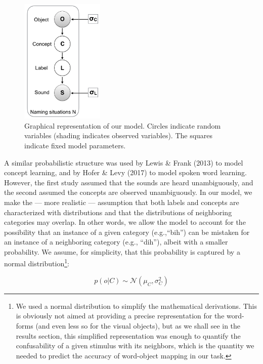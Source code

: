 \documentclass[english,,man]{apa6}
\let\rmarkdownfootnote\footnote%
\def\footnote{\protect\rmarkdownfootnote}
\begin{document}
\begin{figure}

{\centering \includegraphics[width=150px]{figs/model} 

}

\caption{Graphical representation of our model. Circles indicate random variables (shading indicates observed variables). The squares indicate fixed model parameters.}\label{fig:model}
\end{figure}

A similar probabilistic structure was used by Lewis \& Frank (2013) to model concept learning, and by Hofer \& Levy (2017) to model spoken word learning. However, the first study assumed that the sounds are heard unambiguously, and the second assumed the concepts are observed unambiguously. In our model, we make the --- more realistic --- assumption that both labels and concepts are characterized with distributions and that the distributions of neighboring categories may overlap. In other words, we allow the model to account for the possibility that an instance of a given category (e.g.,\enquote{bih}) can be mistaken for an instance of a neighboring category (e.g., \enquote{dih}), albeit with a smaller probability. We assume, for simplicity, that this probability is captured by a normal distribution\footnote{We used a normal distribution to simplify the mathematical derivations. This is obviously not aimed at providing a precise representation for the word-forms (and even less so for the visual objects), but as we shall see in the results section, this simplified representation was enough to quantify the confusability of a given stimulus with its neighbors, which is the quantity we needed to predict the accuracy of word-object mapping in our task.}:

\begin{equation} \label{eq:object}
 p(o | C) \sim  \mathcal{N}(\mu_C, \sigma^2_C) 
\end{equation}
\end{document}
